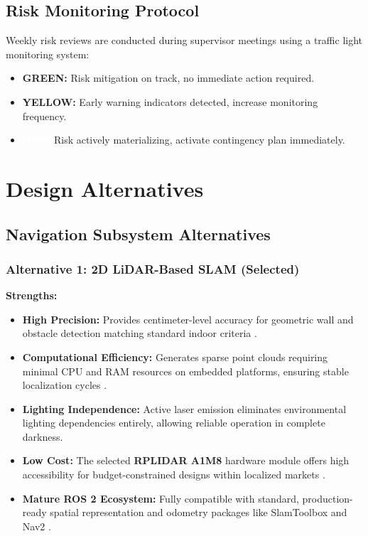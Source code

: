 \documentclass[12pt,a4paper]{report}
\begin{document}
\subsection{Risk Monitoring Protocol}

Weekly risk reviews are conducted during supervisor meetings using a traffic light monitoring system:
\begin{itemize}[leftmargin=*,itemsep=3pt]
    \item \colorbox{lowgreen}{\textbf{GREEN:}} Risk mitigation on track, no immediate action required.
    \item \colorbox{mediumyellow}{\textbf{YELLOW:}} Early warning indicators detected, increase monitoring frequency.
    \item \colorbox{criticalred}{\textcolor{white}{\textbf{RED:}}} Risk actively materializing, activate contingency plan immediately.
\end{itemize}

\section{Design Alternatives}

\subsection{Navigation Subsystem Alternatives}

\subsubsection{Alternative 1: 2D LiDAR-Based SLAM (Selected)}

\textbf{Strengths:}
\begin{itemize}[leftmargin=*,itemsep=2pt]
    \item \textbf{High Precision:} Provides centimeter-level accuracy for geometric wall and obstacle detection matching standard indoor criteria \cite{baltazar_2021,cui_2024}.
    \item \textbf{Computational Efficiency:} Generates sparse point clouds requiring minimal CPU and RAM resources on embedded platforms, ensuring stable localization cycles \cite{tu2025design,cartographer}.
    \item \textbf{Lighting Independence:} Active laser emission eliminates environmental lighting dependencies entirely, allowing reliable operation in complete darkness.
    \item \textbf{Low Cost:} The selected \textbf{RPLIDAR A1M8} hardware module offers high accessibility for budget-constrained designs within localized markets \cite{rplidar_a1m8}.
    \item \textbf{Mature ROS 2 Ecosystem:} Fully compatible with standard, production-ready spatial representation and odometry packages like SlamToolbox \cite{SlamToolbox} and Nav2 \cite{nav2}.
\end{itemize}
\end{document}
